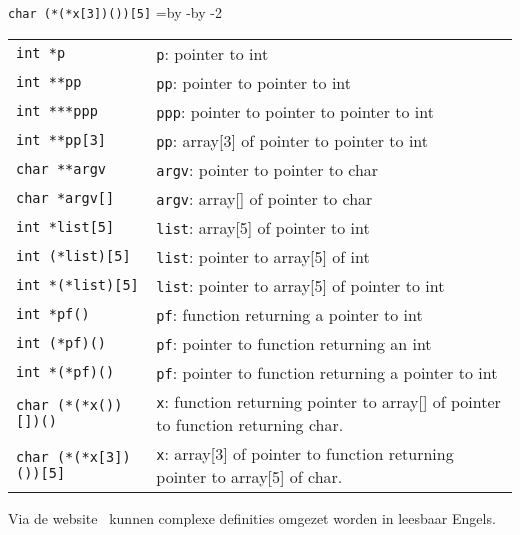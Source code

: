 \hbox{\texttt{char (*(*x[3])())[5]}}
\newdimen\delengte\delengte=\textwidth\advance\delengte by -\advance\delengte by -2\tabcolsep
\begin{table}[!ht]
\begin{tabular}{@{}lp{\delengte}@{}}
\texttt{int *p} & \texttt{p}: pointer to int\\
\texttt{int **pp} & \texttt{pp}: pointer to pointer to int \\
\texttt{int ***ppp} & \texttt{ppp}: pointer to pointer to pointer to int \\
\texttt{int **pp[3]} & \texttt{pp}: array[3] of pointer to pointer to int \\
\texttt{char **argv} & \texttt{argv}: pointer to pointer to char \\
\texttt{char *argv[]} &\texttt{argv}: array[] of pointer to char \\
\texttt{int *list[5]} & \texttt{list}: array[5] of pointer to int \\
\texttt{int (*list)[5]} & \texttt{list}: pointer to array[5] of int \\
\texttt{int *(*list)[5]} & \texttt{list}: pointer to array[5] of pointer to int \\
\texttt{int *pf()} & \texttt{pf}: function returning a pointer to int \\
\texttt{int (*pf)()} & \texttt{pf}: pointer to function returning an int \\
\texttt{int *(*pf)()} & \texttt{pf}: pointer to function returning a pointer to int \\
\texttt{char (*(*x())[])()} & \texttt{x}: function returning pointer to array[] of pointer to function returning char.\\
\texttt{char (*(*x[3])())[5]} & \texttt{x}: array[3] of pointer to function returning pointer to array[5] of char.\\
\end{tabular}
\end{table}

Via de website~\cite{cdeclwebsite} kunnen complexe definities omgezet worden in leesbaar Engels.

\basic
